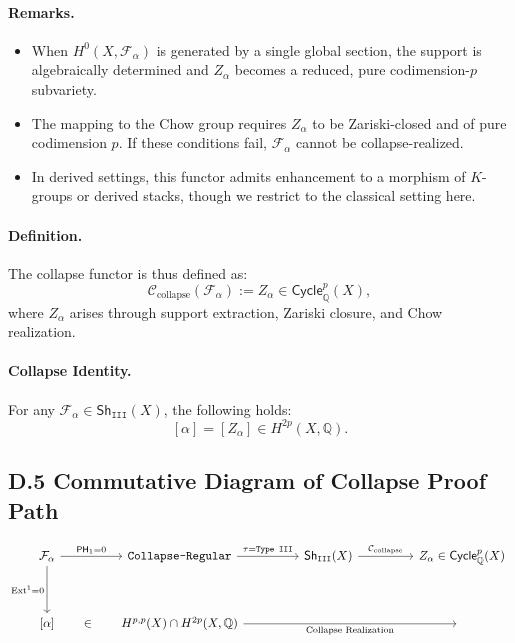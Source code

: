 \documentclass[11pt]{article}
\DeclareMathOperator{\Ext}{Ext}
\begin{document}
\paragraph{Remarks.}

\begin{itemize}
  \item When $H^0(X, \mathcal{F}_\alpha)$ is generated by a single global section, the support is algebraically determined and $Z_\alpha$ becomes a reduced, pure codimension-$p$ subvariety.
  \item The mapping to the Chow group requires $Z_\alpha$ to be Zariski-closed and of pure codimension $p$. If these conditions fail, $\mathcal{F}_\alpha$ cannot be collapse-realized.
  \item In derived settings, this functor admits enhancement to a morphism of $K$-groups or derived stacks, though we restrict to the classical setting here.
\end{itemize}

\paragraph{Definition.}  
The collapse functor is thus defined as:
\[
\mathcal{C}_{\text{collapse}}(\mathcal{F}_\alpha) := Z_\alpha \in \mathsf{Cycle}^p_\mathbb{Q}(X),
\]
where $Z_\alpha$ arises through support extraction, Zariski closure, and Chow realization.

\paragraph{Collapse Identity.}  
For any $\mathcal{F}_\alpha \in \mathsf{Sh}_{\texttt{III}}(X)$, the following holds:
\[
[\alpha] = [Z_\alpha] \in H^{2p}(X, \mathbb{Q}).
\]

\subsection*{D.5 Commutative Diagram of Collapse Proof Path}

\[
\begin{tikzcd}[row sep=3.5em, column sep=4.5em]
\mathcal{F}_\alpha 
  \arrow[r, "\mathsf{PH}_1 = 0"] 
  \arrow[d, swap, "\Ext^1 = 0"]
& \texttt{Collapse-Regular} 
  \arrow[r, "\tau = \texttt{Type III}"]
& \mathsf{Sh}_{\texttt{III}}(X) 
  \arrow[r, "\mathcal{C}_{\text{collapse}}"]
& Z_\alpha \in \mathsf{Cycle}^p_{\mathbb{Q}}(X) \\
{[\alpha]} 
  \arrow[r, phantom, "\in"]
& H^{p,p}(X) \cap H^{2p}(X, \mathbb{Q}) 
  \arrow[rr, "\text{Collapse Realization}"']
& {}
& {}
\end{tikzcd}
\]
\end{document}
